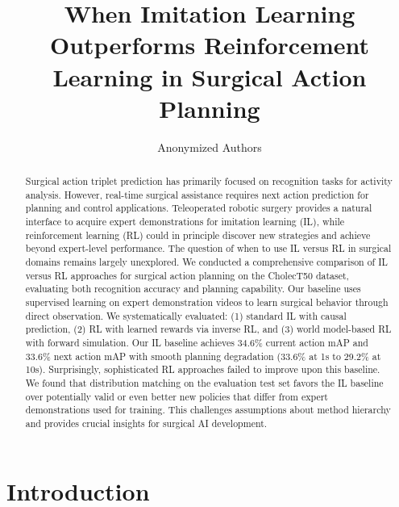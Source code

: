 \documentclass[runningheads]{llncs}
\begin{document}
%
\title{When Imitation Learning Outperforms Reinforcement Learning in Surgical Action Planning}
%
\author{Anonymized Authors}

\maketitle              %
%
\begin{abstract}
Surgical action triplet prediction has primarily focused on recognition tasks for activity analysis. However, real-time surgical assistance requires next action prediction for planning and control applications. Teleoperated robotic surgery provides a natural interface to acquire expert demonstrations for imitation learning (IL), while reinforcement learning (RL) could in principle discover new strategies and achieve beyond expert-level performance. The question of when to use IL versus RL in surgical domains remains largely unexplored. We conducted a comprehensive comparison of IL versus RL approaches for surgical action planning on the CholecT50 dataset, evaluating both recognition accuracy and planning capability. Our baseline uses supervised learning on expert demonstration videos to learn surgical behavior through direct observation. We systematically evaluated: (1) standard IL with causal prediction, (2) RL with learned rewards via inverse RL, and (3) world model-based RL with forward simulation. Our IL baseline achieves 34.6\% current action mAP and 33.6\% next action mAP with smooth planning degradation (33.6\% at 1s to 29.2\% at 10s). Surprisingly, sophisticated RL approaches failed to improve upon this baseline. We found that distribution matching on the evaluation test set favors the IL baseline over potentially valid or even better new policies that differ from expert demonstrations used for training. This challenges assumptions about method hierarchy and provides crucial insights for surgical AI development.

\end{abstract}


\section{Introduction}
\end{document}
